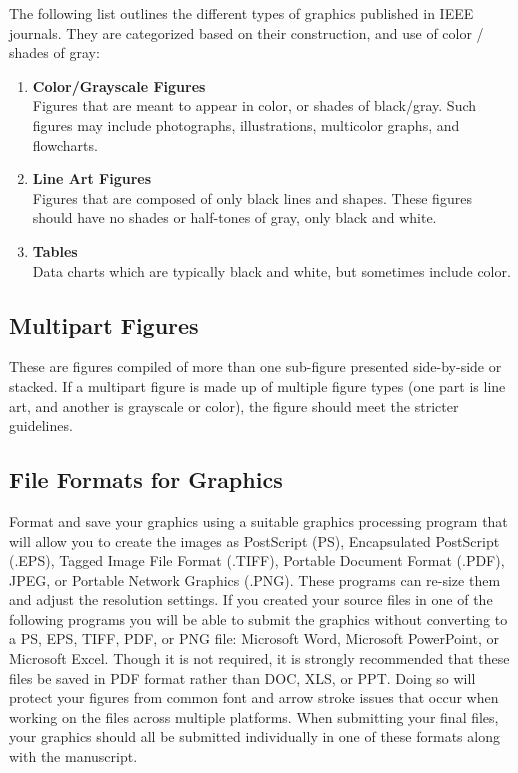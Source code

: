 \documentclass[correspondence]{IEEEtaes}
\begin{document}
The following list outlines the different types of graphics published in IEEE journals. They are categorized based on their construction, and use of color / shades of gray:

\begin{enumerate}
\def\labelenumi{\arabic{enumi})}
\item
  \textbf{Color/Grayscale Figures}\\
  Figures that are meant to appear in color, or shades of black/gray. Such figures may include photographs, illustrations, multicolor graphs, and flowcharts.
\item
  \textbf{Line Art Figures}\\
  Figures that are composed of only black lines and shapes. These figures should have no shades or half-tones of gray, only black and white.
\item
  \textbf{Tables}\\
  Data charts which are typically black and white, but sometimes include color.
\end{enumerate}

\subsection{Multipart Figures}

These are figures compiled of more than one sub-figure presented side-by-side or stacked. If a multipart figure is made up of multiple figure types (one part is line art, and another is grayscale or color), the figure should meet the stricter guidelines.

\subsection{File Formats for Graphics}

Format and save your graphics using a suitable graphics processing program that will allow you to create the images as PostScript (PS), Encapsulated PostScript (.EPS), Tagged Image File Format (.TIFF), Portable Document Format (.PDF), JPEG, or Portable Network Graphics (.PNG). These programs can re-size them and adjust the resolution settings. If you created your source files in one of the following programs you will be able to submit the graphics without converting to a PS, EPS, TIFF, PDF, or PNG file: Microsoft Word, Microsoft PowerPoint, or Microsoft Excel. Though it is not required, it is strongly recommended that these files be saved in PDF format rather than DOC, XLS, or PPT. Doing so will protect your figures from common font and arrow stroke issues that occur when working on the files across multiple platforms. When submitting your final files, your graphics should all be submitted individually in one of these formats along with the manuscript.
\end{document}
